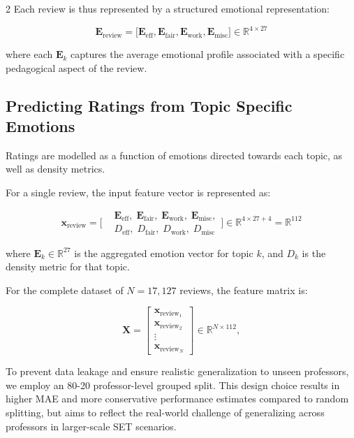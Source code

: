 \documentclass{article}
\begin{document}
\begin{multicols*}{2}
Each review is thus represented by a structured emotional representation:

\begin{equation}
\mathbf{E}_{\text{review}} =
\big[
\mathbf{E}_{\text{eff}},
\mathbf{E}_{\text{fair}},
\mathbf{E}_{\text{work}},
\mathbf{E}_{\text{misc}}
\big]
\in \mathbb{R}^{4 \times 27}
\end{equation}

where each $\mathbf{E}_k$ captures the average emotional profile associated with a specific pedagogical aspect of the review.

\subsection{Predicting Ratings from Topic Specific Emotions}
Ratings are modelled as a function of emotions directed towards each topic, as well as density metrics.

For a single review, the input feature vector is represented as:

\begin{equation}
\mathbf{x}_{\text{review}} =
\Big[
\begin{aligned}
&\mathbf{E}_{\text{eff}}, \;\mathbf{E}_{\text{fair}}, \;\mathbf{E}_{\text{work}}, \;\mathbf{E}_{\text{misc}},\\
& D_{\text{eff}}, \; D_{\text{fair}}, \; D_{\text{work}}, \; D_{\text{misc}}
\end{aligned}
\Big]
\in \mathbb{R}^{4 \times 27 + 4} = \mathbb{R}^{112}
\end{equation}\newline


where $\mathbf{E}_{k} \in \mathbb{R}^{27}$ is the aggregated emotion vector for topic $k$, and $D_{k}$ is the density metric for that topic.

For the complete dataset of $N =17,127$ reviews, the feature matrix is:

\begin{equation}
\mathbf{X} =
\begin{bmatrix}
\mathbf{x}_{\text{review}_1} \\
\mathbf{x}_{\text{review}_2} \\
\vdots \\
\mathbf{x}_{\text{review}_N}
\end{bmatrix}
\in \mathbb{R}^{N \times 112},
\end{equation}

To prevent data leakage and ensure realistic generalization to unseen professors, we employ an 80-20 professor-level grouped split. This design choice results in higher MAE and more conservative performance estimates compared to random splitting, but aims to reflect the real-world challenge of generalizing across professors in larger-scale SET scenarios. 


\end{multicols*}
\end{document}
